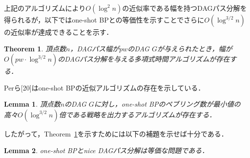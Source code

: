 \documentclass[master]{kuisthesis}		%
\theoremstyle{plain}
\newtheorem{theorem}{Theorem}
\newtheorem{lemma}{Lemma}
\theoremstyle{definition}
\begin{document}
上記のアルゴリズムにより$O(\log ^2 n)$の近似率である幅を持つDAGパス分解を得られるが，以下ではone-shot BPとの等価性を示すことでさらに$O(\log ^{3/2} n)$の近似率が達成できることを示す．

\begin{theorem}\label{approximation2}
    頂点数$n$，DAGパス幅が$pw$のDAG $G$が与えられたとき，幅が$O(pw \cdot \log ^{3/2} n)$のDAGパス分解を与える多項式時間アルゴリズムが存在する．
\end{theorem}


Perら[20]はone-shot BPの近似アルゴリズムの存在を示している．

\begin{lemma}
    頂点数$n$のDAG $G$に対し，one-shot BPのペブリング数が最小値の高々$O(\log ^{3/2} n)$倍である戦略を出力するアルゴリズムが存在する．
\end{lemma}

したがって，Theorem~\ref{approximation2}を示すためには以下の補題を示せば十分である．

\begin{lemma}\label{lemma_approximation2}
    one-shot BPとnice DAGパス分解は等価な問題である．
\end{lemma}
\end{document}
